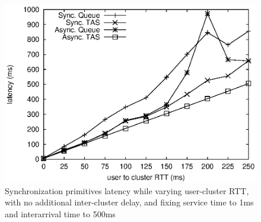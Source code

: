 \begin{figure}[h]
\centering
\includegraphics[scale=0.75]{img/primitives_fixClusterLatency-0.eps}
\caption{Synchronization primitives latency while varying user-cluster RTT, with no additional inter-cluster delay, and fixing service time to 1ms and interarrival time to 500ms}
\label{fig:primitives_vary_delay}
\end{figure}


